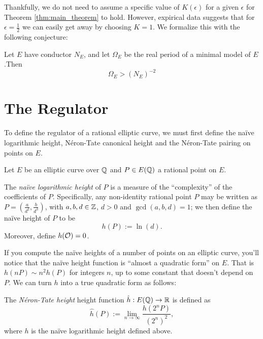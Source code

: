 Thankfully, we do not need to assume a specific value of $K(\epsilon)$ for a given $\epsilon$ for Theorem \ref{thm:main_theorem} to hold. However, expirical data suggests that for $\epsilon=\frac{1}{2}$ we can easily get away by choosing $K = 1$. We formalize this with the following conjecture:
\begin{conjecture}
Let $E$ have conductor $N_E$, and let $\Omega_E$ be the real period of a minimal model of $E$.Then 
\begin{equation}
\Omega_E > (N_E)^{-2}
\end{equation}
\end{conjecture}

\newpage
\section{The Regulator}

To define the regulator of a rational elliptic curve, we must first define the na\"ive logarithmic height, N\'eron-Tate canonical height and the N\'eron-Tate pairing on points on $E$.

Let $E$ be an elliptic curve over $\mathbb{Q}$ and $P \in E(\mathbb{Q})$ a rational point on $E$. 

\begin{definition}
The {\it na\"ive logarithmic height} of $P$ is a measure of the ``complexity'' of the coefficients of $P$. Specifically, any non-identity rational point $P$ may be written as $P = (\frac{a}{d^2},\frac{b}{d^3})$, with $a,b,d \in \mathbb{Z}$, $d>0$ and $\gcd(a,b,d) = 1$; we then define the na\"ive height of $P$ to be
\begin{equation}
	h(P) := \ln(d).
\end{equation}
Moreover, define $h(\mathcal{O}) = 0$.
\end{definition}
If you compute the na\"ive heights of a number of points on an elliptic curve, you'll notice that the na\"ive height function is ``almost a quadratic form'' on $E$. That is $h(nP) \sim n^2 h(P)$ for integers $n$, up to some constant that doesn't depend on $P$. We can turn $h$ into a true quadratic form as follows:

\begin{definition}
The {\it N\'eron-Tate height} height function $\hat{h}: E(\mathbb{Q}) \to \mathbb{R}$ is defined as
\begin{equation}
	\hat{h}(P) := \lim_{n \to \infty} \frac{h(2^n P)}{(2^n)^2},
\end{equation}
where $h$ is the na\"ive logarithmic height defined above.
\end{definition}


